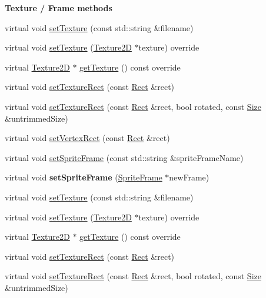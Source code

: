 \begin{Indent}\textbf{ Texture / Frame methods}\par
\begin{DoxyCompactItemize}
\item 
virtual void \hyperlink{classSprite_ae843f9c245dc48ce474099771f1cef06}{set\+Texture} (const std\+::string \&filename)
\item 
virtual void \hyperlink{classSprite_a535b1c82776fb585ab6e040cb8e10196}{set\+Texture} (\hyperlink{classTexture2D}{Texture2D} $\ast$texture) override
\item 
virtual \hyperlink{classTexture2D}{Texture2D} $\ast$ \hyperlink{classSprite_a4358bf91cfd222db7e3d84e63d029031}{get\+Texture} () const override
\item 
virtual void \hyperlink{classSprite_a3d342558db357e2bec2eb3368b41bd1f}{set\+Texture\+Rect} (const \hyperlink{classRect}{Rect} \&rect)
\item 
virtual void \hyperlink{classSprite_ad5cf5f7e651362d5ea7a9635876e464a}{set\+Texture\+Rect} (const \hyperlink{classRect}{Rect} \&rect, bool rotated, const \hyperlink{classSize}{Size} \&untrimmed\+Size)
\item 
virtual void \hyperlink{classSprite_ac3c895e0b1de4273fe1ea121cdfde0f0}{set\+Vertex\+Rect} (const \hyperlink{classRect}{Rect} \&rect)
\item 
virtual void \hyperlink{classSprite_a858e1904c720bdea7cb6a6ad512f1195}{set\+Sprite\+Frame} (const std\+::string \&sprite\+Frame\+Name)
\item 
\mbox{\label{classSprite_a3dce93b6ab84d9204cf4939d6f263867}} 
virtual void {\bfseries set\+Sprite\+Frame} (\hyperlink{classSpriteFrame}{Sprite\+Frame} $\ast$new\+Frame)
\item 
virtual void \hyperlink{classSprite_a2d5e5b2268888fdd00887fed0944cac5}{set\+Texture} (const std\+::string \&filename)
\item 
virtual void \hyperlink{classSprite_a6d0db21ed8499478056aa79fe9c1a344}{set\+Texture} (\hyperlink{classTexture2D}{Texture2D} $\ast$texture) override
\item 
virtual \hyperlink{classTexture2D}{Texture2D} $\ast$ \hyperlink{classSprite_a2b60b30fbc4462b0357368de107780f9}{get\+Texture} () const override
\item 
virtual void \hyperlink{classSprite_a3a39a4885bd293603b54978d9cbd0088}{set\+Texture\+Rect} (const \hyperlink{classRect}{Rect} \&rect)
\item 
virtual void \hyperlink{classSprite_a53a4ae3eb41e4abef0041181e15e0d60}{set\+Texture\+Rect} (const \hyperlink{classRect}{Rect} \&rect, bool rotated, const \hyperlink{classSize}{Size} \&untrimmed\+Size)

\end{DoxyCompactItemize}
\end{Indent}
